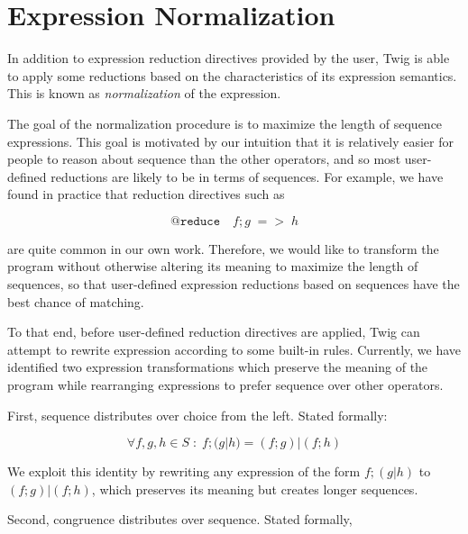% 


\section{Expression Normalization}
\label{sec:red:expr-norm}

In addition to expression reduction directives provided by the
user, Twig is able to apply some reductions based on the
characteristics of its expression semantics. This is known as
\emph{normalization} of the expression.

The goal of the normalization procedure is to maximize the length
of sequence expressions. This goal is motivated by our intuition
that it is relatively easier for people to reason about sequence
than the other operators, and so most user-defined reductions are
likely to be in terms of sequences. For example, we have found in
practice that reduction directives such as

\[
\mathtt{@reduce}\quad f;g \;\mathtt{=>}\; h
\]

are quite common in our own work. Therefore, we would like to
transform the program without otherwise altering its meaning to
maximize the length of sequences, so that user-defined expression
reductions based on sequences have the best chance of matching.

To that end, before user-defined reduction directives are applied,
Twig can attempt to rewrite expression according to some built-in
rules. Currently, we have identified two expression
transformations which preserve the meaning of the program while
rearranging expressions to prefer sequence over other operators.

First, sequence distributes over choice from the left. Stated
formally:

\[
\forall f,g,h \in S \;:\; f;(g|h) = (f;g)|(f;h)
\]

We exploit this identity by rewriting any expression of the form
$f;(g|h)$ to $(f;g)|(f;h)$, which preserves its meaning but
creates longer sequences.

Second, congruence distributes over sequence. Stated formally,

